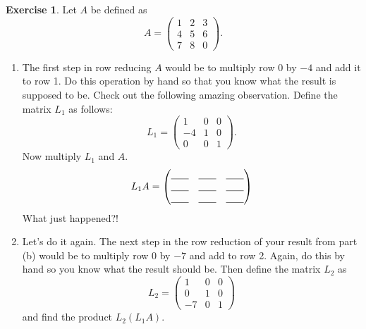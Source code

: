 \documentclass[
]{book}
\providecommand{\tightlist}{%
  \setlength{\itemsep}{0pt}\setlength{\parskip}{0pt}}
\theoremstyle{definition}
\theoremstyle{definition}
\theoremstyle{definition}
\newtheorem{exercise}{Exercise}[chapter]
\theoremstyle{remark}
\begin{document}
\begin{exercise}
\protect\hypertarget{exr:unnamed-chunk-314}{}{\label{exr:unnamed-chunk-314} }Let \(A\) be defined as
\[ A = \begin{pmatrix} 1 & 2 & 3 \\ 4 & 5 & 6 \\ 7 & 8 & 0 \end{pmatrix}. \]

\begin{enumerate}
\def\labelenumi{\alph{enumi}.}
\tightlist
\item
  The first step in row reducing \(A\) would be to multiply row 0 by \(-4\) and add it to row 1. Do this operation by hand so that you know what the result is supposed to be. Check out the following amazing observation. Define the matrix \(L_1\) as follows:
  \[ L_1 = \begin{pmatrix} 1 & 0 & 0 \\ -4 & 1 & 0 \\ 0 & 0 & 1 \end{pmatrix}. \]
  Now multiply \(L_1\) and \(A\).
  \[ L_1 A = \begin{pmatrix} \underline{\hspace{0.25in}} & \underline{\hspace{0.25in}} & \underline{\hspace{0.25in}} \\ \underline{\hspace{0.25in}} & \underline{\hspace{0.25in}} & \underline{\hspace{0.25in}} \\ \underline{\hspace{0.25in}} & \underline{\hspace{0.25in}} & \underline{\hspace{0.25in}} \end{pmatrix} \]
  What just happened?!
\item
  Let's do it again. The next step in the row reduction of your result from part (b) would be to multiply row 0 by \(-7\) and add to row 2. Again, do this by hand so you know what the result should be. Then define the matrix \(L_2\) as
  \[ L_2 = \begin{pmatrix} 1 & 0 & 0 \\ 0 & 1 & 0 \\ -7 & 0 & 1 \end{pmatrix} \]
  and find the product \(L_2 \left( L_1 A \right)\).

\end{enumerate}
\end{exercise}
\end{document}
